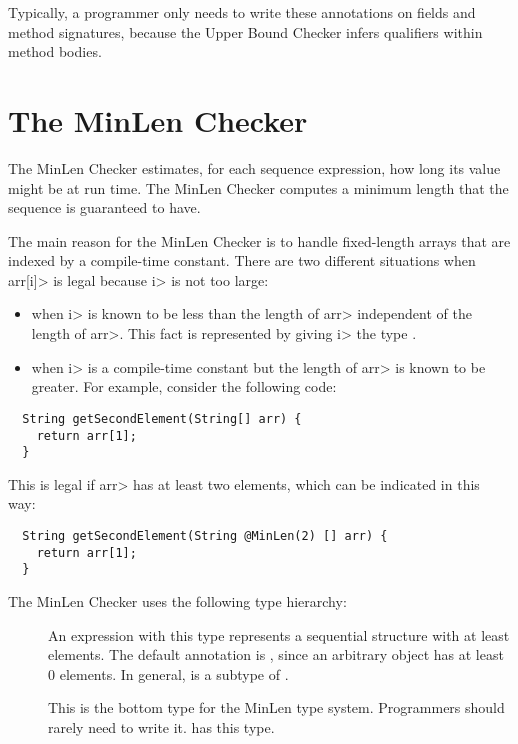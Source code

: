 Typically, a programmer only needs to write these annotations on
fields and method signatures, because the Upper Bound Checker infers
qualifiers within method bodies.

\section{The MinLen Checker\label{index-minlen}}

The MinLen Checker estimates, for each sequence expression, how long its value
might be at run time.  The MinLen Checker computes a minimum length that
the sequence is guaranteed to have.

The main reason for the MinLen Checker is to handle fixed-length arrays
that are indexed by a compile-time constant.
There are two different situations when \<arr[i]> is legal because \<i> is
not too large:
\begin{itemize}
\item
  when \<i> is known to be less than the length of \<arr> independent of the length of
  \<arr>.  This fact is represented by giving \<i> the type .
\item
  when \<i> is a compile-time constant but the length of \<arr> is known to
  be greater.  For example, consider the following code:
\end{itemize}

\begin{Verbatim}
  String getSecondElement(String[] arr) {
    return arr[1];
  }
\end{Verbatim}
  This is legal if \<arr> has at least two elements, which can be indicated
  in this way:
\begin{Verbatim}
  String getSecondElement(String @MinLen(2) [] arr) {
    return arr[1];
  }
\end{Verbatim}

The MinLen Checker uses the following type hierarchy:

\begin{description}
\item[]
  An expression with this type represents a sequential structure
  with at least  elements.  The default annotation is
  , since an arbitrary object has at least 0 elements.
  In general,  is a subtype of .
\item[]
  This is the bottom type for the MinLen type system.
  Programmers should rarely need to write it.
   has this type.
  \end{description}

